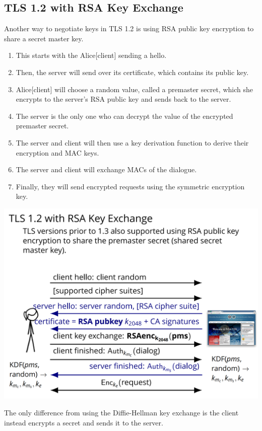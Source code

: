 \documentclass[11pt]{article} %
\begin{document}
\newpage
\subsection{TLS 1.2 with RSA Key Exchange}
Another way to negotiate keys in TLS 1.2 is using RSA public key encryption to 
share a secret master key.

\begin{enumerate}
  \item This starts with the Alice[client] sending a hello.
  \item Then, the server will send over its certificate, which contains its 
  public key.
  \item Alice[client] will choose a random value, called a premaster secret, 
  which she encrypts to the server's RSA public key and sends back to the 
  server.
  \item The server is the only one who can decrypt the value of the encrypted 
  premaster secret.
  \item The server and client will then use a key derivation function to 
  derive their encryption and MAC keys.
  \item The server and client will exchange MACs of the dialogue.
  \item Finally, they will send encrypted requests using the symmetric 
  encryption key.
\end{enumerate}

\includegraphics[scale=.6]{./TLS_RSA.png}

The only difference from using the Diffie-Hellman key exchange is the client 
instead encrypts a secret and sends it to the server.
\end{document}
